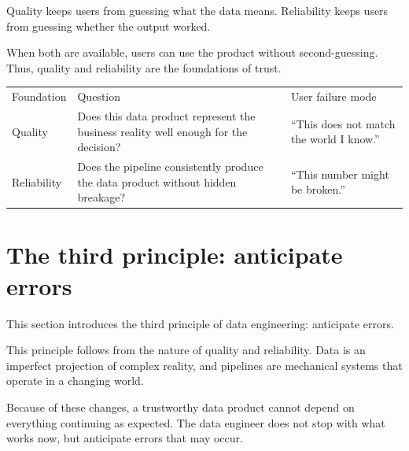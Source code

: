 \documentclass[10pt,openany,10pt]{book}
\newcounter{none}
\let\podeToprule\toprule
\let\podeMidrule\midrule
\let\podeBottomrule\bottomrule
\renewcommand{\toprule}{\arrayrulecolor{pbiGrid}\podeToprule}
\renewcommand{\midrule}{\arrayrulecolor{pbiGrid}\podeMidrule}
\renewcommand{\bottomrule}{\arrayrulecolor{pbiGrid}\podeBottomrule}
\begin{document}
Quality keeps users from guessing what the data means. Reliability keeps
users from guessing whether the output worked.

When both are available, users can use the product without
second-guessing. Thus, quality and reliability are the foundations of
trust.

{\def\LTcaptype{none} %
\begin{longtable}[]{@{}
  >{\raggedright\arraybackslash}p{}
  >{\raggedright\arraybackslash}p{}
  >{\raggedright\arraybackslash}p{}@{}}
\toprule\noalign{}
\begin{minipage}[b]{\linewidth}\raggedright
Foundation
\end{minipage} & \begin{minipage}[b]{\linewidth}\raggedright
Question
\end{minipage} & \begin{minipage}[b]{\linewidth}\raggedright
User failure mode
\end{minipage} \\
\midrule\noalign{}
\endhead
\bottomrule\noalign{}
\endlastfoot
Quality & Does this data product represent the business reality well
enough for the decision? & ``This does not match the world I know.'' \\
Reliability & Does the pipeline consistently produce the data product
without hidden breakage? & ``This number might be broken.'' \\
\end{longtable}
}

\section{The third principle: anticipate
errors}\label{the-third-principle-anticipate-errors}

This section introduces the third principle of data engineering:
anticipate errors.

This principle follows from the nature of quality and reliability. Data
is an imperfect projection of complex reality, and pipelines are
mechanical systems that operate in a changing world.

Because of these changes, a trustworthy data product cannot depend on
everything continuing as expected. The data engineer does not stop with
what works now, but anticipate errors that may occur.
\end{document}
